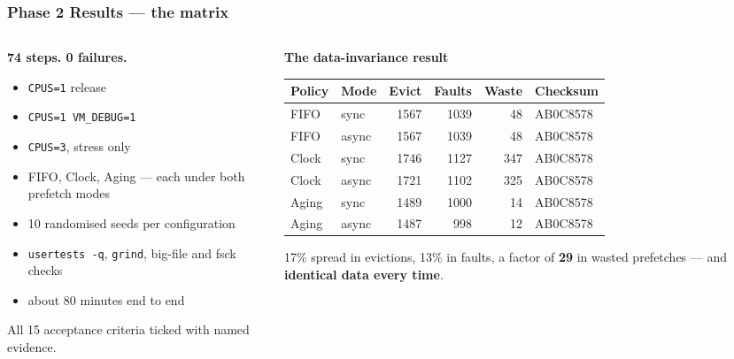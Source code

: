 \documentclass[10pt,aspectratio=169]{beamer}
\newcommand{\good}[1]{\textcolor{good}{#1}}
\newcommand{\phasehead}[2]{%
  \frametitle{#1 \quad\small\normalfont\textcolor{white!75!accent}{#2}}}
\begin{document}
\begin{frame}
  \phasehead{Phase 2}{Results --- the matrix}
  \begin{columns}[T]
    \begin{column}{0.44\textwidth}
      \small
      \textbf{\good{74 steps. 0 failures.}}
      \medskip
      \begin{itemize}\small
        \item \texttt{CPUS=1} release
        \item \texttt{CPUS=1 VM\_DEBUG=1}
        \item \texttt{CPUS=3}, stress only
        \item FIFO, Clock, Aging --- each under both prefetch modes
        \item 10 randomised seeds per configuration
        \item \texttt{usertests -q}, \texttt{grind}, big-file and fsck checks
        \item about 80 minutes end to end
      \end{itemize}
      \medskip
      All 15 acceptance criteria ticked with named evidence.
    \end{column}
    \begin{column}{0.54\textwidth}
      \small\textbf{The data-invariance result}\\[4pt]
      \scriptsize
      \begin{tabular}{@{}llrrrl@{}}
        \toprule
        Policy & Mode & Evict & Faults & Waste & Checksum \\
        \midrule
        FIFO  & sync  & 1567 & 1039 &  48 & \good{AB0C8578} \\
        FIFO  & async & 1567 & 1039 &  48 & \good{AB0C8578} \\
        Clock & sync  & 1746 & 1127 & 347 & \good{AB0C8578} \\
        Clock & async & 1721 & 1102 & 325 & \good{AB0C8578} \\
        Aging & sync  & 1489 & 1000 &  14 & \good{AB0C8578} \\
        Aging & async & 1487 &  998 &  12 & \good{AB0C8578} \\
        \bottomrule
      \end{tabular}

      \medskip
      \small
      17\% spread in evictions, 13\% in faults, a factor of \textbf{29} in
      wasted prefetches --- and \textbf{identical data every time}.
    \end{column}
  \end{columns}
\end{frame}
\end{document}
